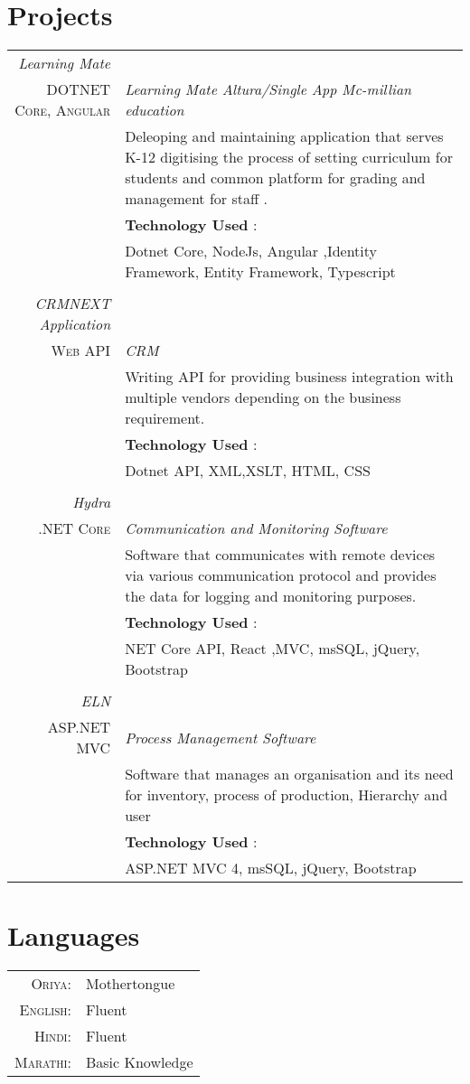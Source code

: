 \section{Projects}


\begin{tabular}{r|p{11cm}}

 \emph{Learning Mate} \\\textsc{DOTNET Core, Angular}&\emph{ Learning Mate Altura/Single App Mc-millian education}\\&\footnotesize{ Deleoping and maintaining application that serves K-12 digitising the process of setting curriculum for students and common platform for grading and management for staff  }. \\
 & \textbf{Technology Used }: \\
 & {Dotnet Core, NodeJs, Angular ,Identity Framework, Entity Framework, Typescript}\\\multicolumn{2}{c}{} \\


 \emph{CRMNEXT Application} \\\textsc{Web API}&\emph{ CRM }\\&\footnotesize{ Writing API for providing business integration with multiple vendors depending on the business requirement.} \\
 & \textbf{Technology Used }: \\
 & {Dotnet API, XML,XSLT, HTML, CSS}\\\multicolumn{2}{c}{} \\


 \emph{Hydra} \\\textsc{.NET Core}&\emph{ Communication and Monitoring Software}\\&\footnotesize{ Software that communicates with remote devices via various communication protocol and provides the data for logging and monitoring purposes.} \\
 & \textbf{Technology Used }: \\
 & {NET Core API, React ,MVC, msSQL, jQuery, Bootstrap}\\\multicolumn{2}{c}{} \\
 
 \emph{ELN} \\\textsc{ASP.NET MVC}&\emph{ Process Management Software}\\&\footnotesize{Software that manages an organisation and its need for inventory, process of production, Hierarchy and user} \\
 & \textbf{Technology Used }: \\
 & {ASP.NET MVC 4, msSQL, jQuery, Bootstrap}\\
\end{tabular}

\section{Languages}
\begin{tabular}{rl}
 \textsc{Oriya:}&Mothertongue\\
\textsc{English:}&Fluent\\
\textsc{Hindi:}&Fluent\\
\textsc{Marathi:}&Basic Knowledge\\
\end{tabular}



